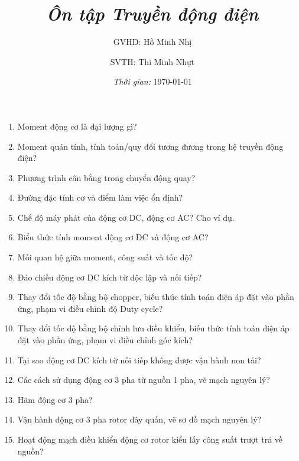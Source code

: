 \documentclass[12pt,a4paper]{article}
\begin{document}
\title{\textbf{\textit{Ôn tập Truyền động điện}}}
\author{GVHD: Hồ Minh Nhị \and SVTH: Thi Minh Nhựt}
\date{\textit{Thời gian:} \today}
\maketitle
\begin{enumerate}
	\item Moment động cơ là đại lượng gì?
	
	\item Moment quán tính, tính toán/quy đổi tương đương trong hệ truyền động điện?
	
	\item Phương trình cân bằng trong chuyển động quay?
	
	\item Đường đặc tính cơ và điểm làm việc ổn định?
	
	\item Chế độ máy phát của động cơ DC, động cơ AC? Cho ví dụ.
	
	\item Biểu thức tính moment động cơ DC và động cơ AC?
	
	\item Mối quan hệ giữa moment, công suất và tốc độ?
	
	\item Đảo chiều động cơ DC kích từ độc lập và nối tiếp?
	
	\item Thay đổi tốc độ bằng bộ chopper, biếu thức tính toán điện áp đặt vào phần ứng, phạm vi điều chỉnh độ Duty cycle?
	
	\item Thay đổi tốc độ bằng bộ chỉnh lưu điều khiển, biếu thức tính toán điện áp đặt vào phần ứng, phạm vi điều chỉnh góc kích?
	
	\item Tại sao động cơ DC kích từ nối tiếp không được vận hành non tải?
	
	\item Các cách sử dụng động cơ 3 pha từ nguồn 1 pha, vẽ mạch nguyên lý?
	
	\item Hãm động cơ 3 pha?
	
	\item Vận hành động cơ 3 pha rotor dây quấn, vẽ sơ đồ mạch nguyên lý?
	
	\item Hoạt động mạch điều khiển động cơ rotor kiểu lấy công suất trượt trả về nguồn?


\end{enumerate}
\end{document}
